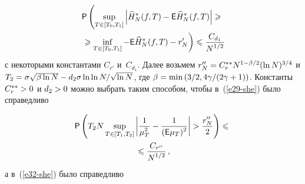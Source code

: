 \begin{multicols}{2}
\noindent
\begin{multline}
{\sf P}\left(\sup\limits_{T\in[T_0,T_1]}\left\vert\widehat{H}^{*}_N(f,T)-{\sf E}\widehat{H}^{*}_N(f,T)\right\vert
\geqslant{}\right.\\
\left.{}\geqslant\inf\limits_{T\in[T_0,T_1]}-{\sf E}\widehat{H}^{*}_N(f,T)-r'_N\right)\leqslant 
\displaystyle\frac{\displaystyle C_{d_1}\mathstrut}{\displaystyle N^{{1}/{2}}\mathstrut}\label{e42-she}
\end{multline}
с некоторыми константами $C_{r'}$ и~$C_{d_1}$. Далее возьмем $r''_N\hm=C^{**}_r N^{1-\beta/2}(\ln N)^{3/4}$ и 
$T_2\hm=\sigma\sqrt{\beta\ln N}\hm-d_2\sigma\ln\ln N/\sqrt{\ln N}$, где $\beta\hm=\min\left({3}/{2},{4\gamma}/({2\gamma+1})\right)$.
 Константы $C^{**}_r\hm>0$ и $d_2\hm>0$ можно выбрать таким способом, чтобы в~(\ref{e29-she}) было справедливо
 
 \noindent
\begin{multline}
{\sf P}\left(T_2N\sup\limits_{T\in[T_1,T_2]}\left\vert\displaystyle\frac{\displaystyle 1\mathstrut}{\displaystyle \mu^2_T\mathstrut}-\displaystyle\frac{\displaystyle 1\mathstrut}{\displaystyle ({\sf E}\mu_T)^2\mathstrut}\right\vert>
\displaystyle\frac{\displaystyle r''_N\mathstrut}{\displaystyle 2\mathstrut}\right)\leqslant {}\\
{}\leqslant\displaystyle\frac{\displaystyle C_{r''}\mathstrut}{\displaystyle N^{{1}/{2}}\mathstrut}\,,\label{e43-she}
\end{multline}
а в~(\ref{e32-she}) было справедливо

\pagebreak


\end{multicols}
